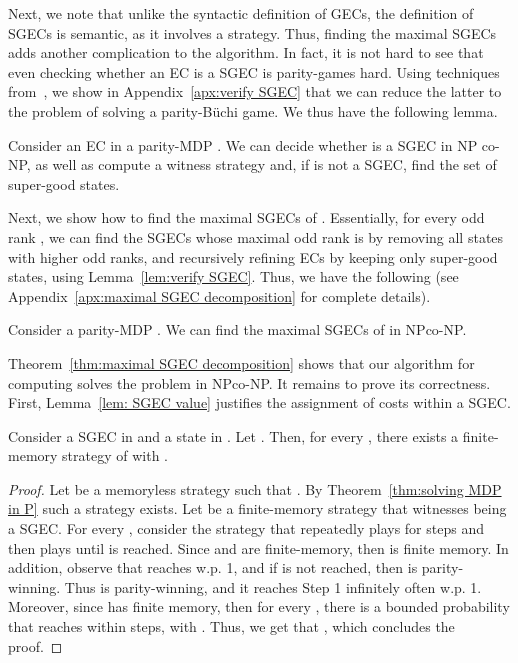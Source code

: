 \documentclass[runningheads,a4paper]{llncs}
\newcommand{\buchi}{B\"uchi\xspace}
\newcommand{\sgec}{{SGEC}\xspace}
\newcommand{\gecs}{{GECs}\xspace}
\newcommand{\sgecs}{{SGECs}\xspace}
\begin{document}
Next, we note that unlike the syntactic definition of \gecs, the definition of \sgecs is semantic, as it involves a strategy. Thus, finding the maximal \sgecs adds another complication to the algorithm. In fact, it is not hard to see that even checking whether an EC is a \sgec is parity-games hard. Using techniques from~\cite{CD11}, we show in Appendix~\ref{apx:verify SGEC} that we can reduce the latter to the problem of solving a parity-\buchi game. 
We thus have the following lemma.
\vspace*{-5pt}
\begin{lemma}
\label{lem:verify SGEC}
Consider an EC  in a parity-MDP . We can decide whether  is a \sgec in NP co-NP, as well as compute a witness strategy and, if  is not a \sgec, find the set of super-good states.
\end{lemma}
\vspace*{-5pt}




Next, we show how to find the maximal \sgecs of . Essentially, for every odd rank , we can find the \sgecs whose maximal odd rank is  by removing all states with higher odd ranks, and recursively refining ECs by keeping only super-good states, using Lemma~\ref{lem:verify SGEC}. Thus, we have the following (see Appendix~\ref{apx:maximal SGEC decomposition} for complete details).
\vspace*{-5pt}
\begin{theorem}
\label{thm:maximal SGEC decomposition}
Consider a parity-MDP . We can find the maximal \sgecs of  in NPco-NP.
\end{theorem}
\vspace*{-5pt}


Theorem~\ref{thm:maximal SGEC decomposition} shows that our algorithm for computing  solves the problem in NPco-NP. 
It remains to prove its correctness.
First, Lemma~\ref{lem: SGEC value} justifies the assignment of costs within a \sgec.
\vspace*{-5pt}
\begin{lemma}
\label{lem: SGEC value}
Consider a \sgec  in  and a state  in . Let . 
Then, for every , there exists a finite-memory strategy  of  with . 
\end{lemma}
\vspace*{-10pt}
\begin{proof}
Let  be a memoryless strategy such that . By Theorem~\ref{thm:solving MDP in P} such a strategy exists. Let  be a finite-memory strategy that witnesses  being a \sgec.
For every , consider the strategy  that repeatedly plays  for  steps and then plays  until  is reached.
Since  and  are finite-memory, then  is finite memory. In addition, observe that  reaches  w.p. 1, and if  is not reached, then  is parity-winning. Thus  is parity-winning, and it reaches Step 1 infinitely often w.p. 1. Moreover, since  has finite memory, then for every , there is a bounded probability  that  reaches  within  steps, with . Thus, we get that , which concludes the proof.
\end{proof}
\end{document}
